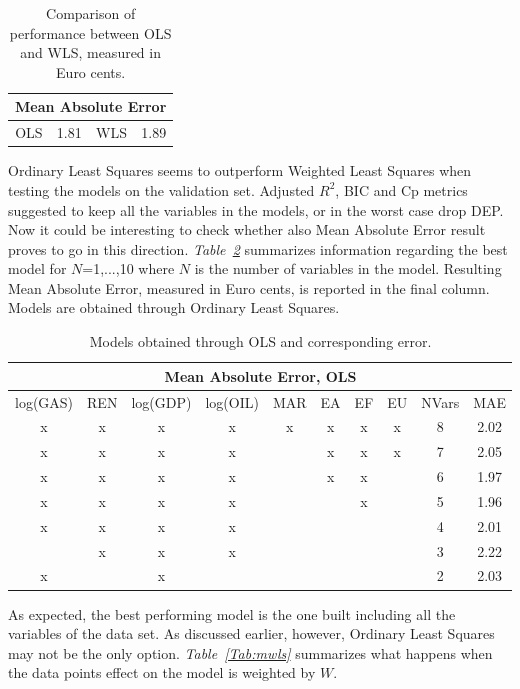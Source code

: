 \documentclass[a4paper,12pt]{book}
\begin{document}
\begin{table}[tb]
\begin{center}
\begin{tabular}{|c|c|c|c|}
\hline
\multicolumn{4}{|c|}{Mean Absolute Error}\\
\hline
OLS&1.81&WLS&1.89\\
\hline
\end{tabular}
\caption{Comparison of performance between OLS and WLS, measured in Euro cents.}
\label{Tab:mae}
\end{center}
\end{table}

Ordinary Least Squares seems to outperform Weighted Least Squares when testing the models on the validation set. Adjusted $R^2$, BIC and Cp metrics suggested to keep all the variables in the models, or in the worst case drop DEP. Now it could be interesting to check whether also Mean Absolute Error result proves to go in this direction. \textit{Table~\ref{Tab:maeols}} summarizes information regarding the best model for $N$=1,...,10 where $N$ is the number of variables in the model. Resulting Mean Absolute Error, measured in Euro cents, is reported in the final column. Models are obtained through Ordinary Least Squares.

\begin{table}[tb]
\begin{center}
\begin{tabular}{|c|c|c|c|c|c|c|c|c|c|}
\hline
\multicolumn{10}{|c|}{Mean Absolute Error, OLS}\\
\hline
log(GAS)&REN&log(GDP)&log(OIL)&MAR&EA&EF&EU&NVars&MAE\\
\hline
x&x&x&x&x&x&x&x&8&2.02\\
x&x&x&x&&x&x&x&7&2.05\\
x&x&x&x&&x&x&&6&1.97\\
x&x&x&x&&&x&&5&1.96\\
x&x&x&x&&&&&4&2.01\\
&x&x&x&&&&&3&2.22\\
x&&x&&&&&&2&2.03\\
\hline
\end{tabular}
\caption{Models obtained through OLS and corresponding error.}
\label{Tab:maeols}
\end{center}
\end{table}

As expected, the best performing model is the one built including all the variables of the data set. As discussed earlier, however, Ordinary Least Squares may not be the only option. \textit{Table~\ref{Tab:mwls}} summarizes what happens when the data points effect on the model is weighted by $W$.
\end{document}
